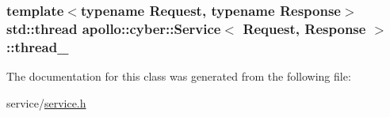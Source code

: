 \hypertarget{classapollo_1_1cyber_1_1Service_a84cad59fd572efc77b81e5f1169d273a}{
\subsubsection[{thread\-\_\-}]{\setlength{\rightskip}{0pt plus 5cm}template$<$typename Request, typename Response$>$ std\-::thread {\bf apollo\-::cyber\-::\-Service}$<$ Request, Response $>$\-::thread\-\_\-\hspace{0.3cm}{\ttfamily [private]}}}\label{classapollo_1_1cyber_1_1Service_a84cad59fd572efc77b81e5f1169d273a}


The documentation for this class was generated from the following file\-:\begin{DoxyCompactItemize}
\item 
service/\hyperlink{service_8h}{service.\-h}\end{DoxyCompactItemize}
